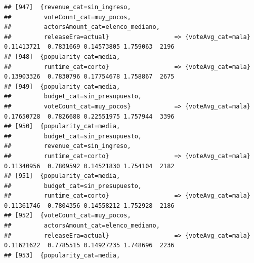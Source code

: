 \documentclass[
]{article}
\begin{document}
\begin{verbatim}
## [947]  {revenue_cat=sin_ingreso,                                                                                                
##         voteCount_cat=muy_pocos,                                                                                                
##         actorsAmount_cat=elenco_mediano,                                                                                        
##         releaseEra=actual}                  => {voteAvg_cat=mala}                0.11413721  0.7831669 0.14573805 1.759063  2196
## [948]  {popularity_cat=media,                                                                                                   
##         runtime_cat=corto}                  => {voteAvg_cat=mala}                0.13903326  0.7830796 0.17754678 1.758867  2675
## [949]  {popularity_cat=media,                                                                                                   
##         budget_cat=sin_presupuesto,                                                                                             
##         voteCount_cat=muy_pocos}            => {voteAvg_cat=mala}                0.17650728  0.7826688 0.22551975 1.757944  3396
## [950]  {popularity_cat=media,                                                                                                   
##         budget_cat=sin_presupuesto,                                                                                             
##         revenue_cat=sin_ingreso,                                                                                                
##         runtime_cat=corto}                  => {voteAvg_cat=mala}                0.11340956  0.7809592 0.14521830 1.754104  2182
## [951]  {popularity_cat=media,                                                                                                   
##         budget_cat=sin_presupuesto,                                                                                             
##         runtime_cat=corto}                  => {voteAvg_cat=mala}                0.11361746  0.7804356 0.14558212 1.752928  2186
## [952]  {voteCount_cat=muy_pocos,                                                                                                
##         actorsAmount_cat=elenco_mediano,                                                                                        
##         releaseEra=actual}                  => {voteAvg_cat=mala}                0.11621622  0.7785515 0.14927235 1.748696  2236
## [953]  {popularity_cat=media,                                                                                                   

\end{verbatim}
\end{document}

